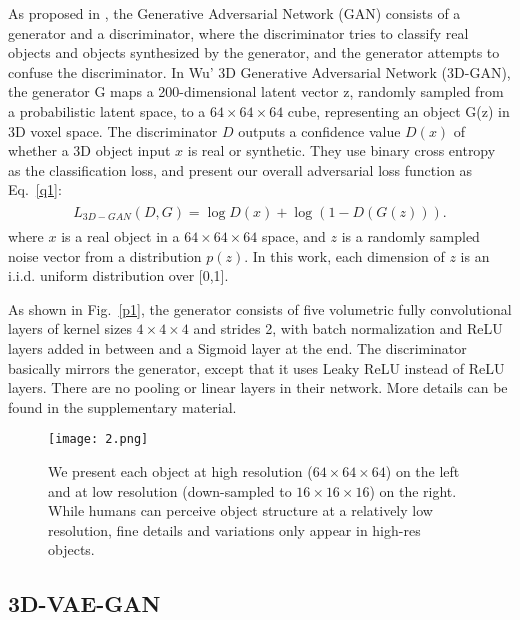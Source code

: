 \documentclass[10pt,twocolumn,letterpaper]{article}
\begin{document}
As proposed in \cite{Goodfellow2014Generative}, the Generative Adversarial Network (GAN) consists of a generator and a discriminator, where the discriminator tries to classify real objects and objects synthesized by the generator, and the generator attempts to confuse the discriminator. In Wu' 3D Generative Adversarial Network (3D-GAN), the generator G maps a 200-dimensional latent vector z, randomly sampled from a probabilistic latent space, to a $64\times 64\times 64$ cube, representing an object G(z) in 3D voxel space. The discriminator $D$ outputs a confidence value $D(x)$ of whether a 3D object input $x$ is real or synthetic. They use binary cross entropy as the classification loss, and present our overall adversarial loss function as Eq.~\ref{q1}:
\begin{equation}
\begin{aligned}
\begin{split}
L_{3D-GAN}(D,G)=\log D(x)+\log(1-D(G(z))).
\label{q1}
\end{split}
\end{aligned}
\end{equation}
where $x$ is a real object in a $64\times 64\times 64$ space, and $z$ is a randomly sampled noise vector from a distribution $p(z)$. In this work, each dimension of $z$ is an i.i.d. uniform distribution over [0,1].

As shown in Fig.~\ref{p1}, the generator consists of five volumetric fully convolutional layers of kernel sizes $4\times 4\times 4$ and strides 2, with batch normalization and ReLU layers added in between and a Sigmoid layer at the end. The discriminator basically mirrors the generator, except that it uses Leaky ReLU instead of ReLU layers. There are no pooling or linear layers in their network. More details can be found in the supplementary material.

\begin{figure*}
	\begin{center}
		\texttt{[image: 2.png]}
	\end{center}
	\caption{We present each object at high resolution ($64\times 64\times 64$) on the left and at low resolution (down-sampled to $16\times 16\times 16$) on the right. While humans can perceive object structure at a relatively low resolution, fine details and variations only appear in high-res objects.}
	\label{p2}
\end{figure*}

\subsection{3D-VAE-GAN}
\end{document}
